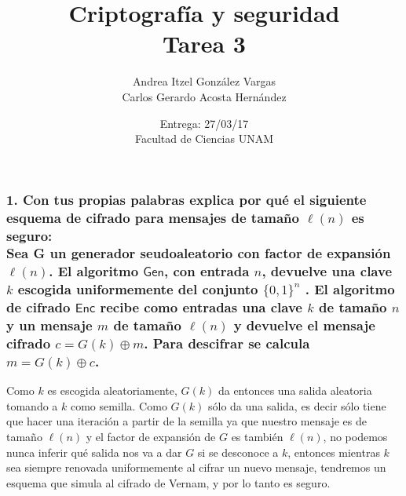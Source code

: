 \documentclass[12pt]{article}
\title{Criptografía y seguridad \\ Tarea 3}
\author{Andrea Itzel González Vargas \\ Carlos Gerardo Acosta Hernández}
\date{Entrega: 27/03/17 \\ Facultad de Ciencias UNAM}
\begin{document}
\maketitle
\subsubsection*{1. Con tus propias palabras explica por qué el siguiente esquema de cifrado para mensajes de tamaño $\ell(n)$ es seguro: \\
Sea G un generador seudoaleatorio con factor de expansión $\ell (n)$. El algoritmo $\textsf{Gen}$, con entrada $n$, devuelve una clave $k$ escogida uniformemente del conjunto $\{0, 1\}^n$ . El algoritmo de cifrado $\textsf{Enc}$ recibe como entradas una clave $k$ de tamaño $n$ y un mensaje $m$ de tamaño $\ell (n)$ y devuelve el mensaje cifrado $c = G(k) \oplus m$. Para descifrar se calcula $m = G(k) \oplus c$.}
Como $k$ es escogida aleatoriamente, $G(k)$ da entonces una salida aleatoria tomando a $k$ como semilla. Como $G(k)$ sólo da una salida, es decir sólo tiene que hacer una iteración a partir de la semilla ya que nuestro mensaje es de tamaño $\ell(n)$ y el factor de expansión de $G$ es también $\ell(n)$, no podemos nunca inferir qué salida nos va a dar $G$ si se desconoce a $k$, entonces mientras $k$ sea siempre renovada uniformemente al cifrar un nuevo mensaje, tendremos un esquema que simula al cifrado de Vernam, y por lo tanto es seguro.
\end{document}
